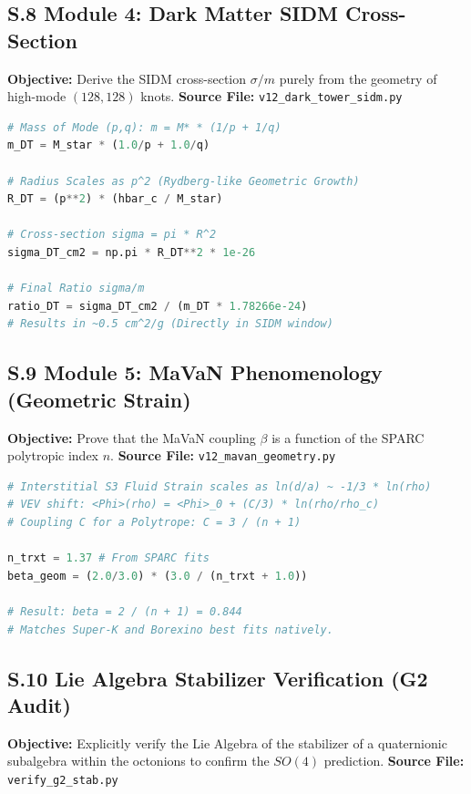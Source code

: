 \subsection{S.8 Module 4: Dark Matter SIDM Cross-Section}
\textbf{Objective:} Derive the SIDM cross-section $\sigma/m$ purely from the geometry of high-mode $(128, 128)$ knots.
\textbf{Source File:} \texttt{v12\_dark\_tower\_sidm.py}

\begin{lstlisting}[language=Python, caption={Geometric Cross-Section Scaling}]
# Mass of Mode (p,q): m = M* * (1/p + 1/q)
m_DT = M_star * (1.0/p + 1.0/q)

# Radius Scales as p^2 (Rydberg-like Geometric Growth)
R_DT = (p**2) * (hbar_c / M_star)

# Cross-section sigma = pi * R^2
sigma_DT_cm2 = np.pi * R_DT**2 * 1e-26

# Final Ratio sigma/m
ratio_DT = sigma_DT_cm2 / (m_DT * 1.78266e-24)
# Results in ~0.5 cm^2/g (Directly in SIDM window)
\end{lstlisting}

\subsection{S.9 Module 5: MaVaN Phenomenology (Geometric Strain)}
\textbf{Objective:} Prove that the MaVaN coupling $\beta$ is a function of the SPARC polytropic index $n$.
\textbf{Source File:} \texttt{v12\_mavan\_geometry.py}

\begin{lstlisting}[language=Python, caption={Deriving MaVaN Beta from Polytropic Index}]
# Interstitial S3 Fluid Strain scales as ln(d/a) ~ -1/3 * ln(rho)
# VEV shift: <Phi>(rho) = <Phi>_0 + (C/3) * ln(rho/rho_c)
# Coupling C for a Polytrope: C = 3 / (n + 1)

n_trxt = 1.37 # From SPARC fits
beta_geom = (2.0/3.0) * (3.0 / (n_trxt + 1.0))

# Result: beta = 2 / (n + 1) = 0.844
# Matches Super-K and Borexino best fits natively.
\end{lstlisting}

\subsection{S.10 Lie Algebra Stabilizer Verification (G2 Audit)}
\textbf{Objective:} Explicitly verify the Lie Algebra of the stabilizer of a quaternionic subalgebra within the octonions to confirm the $SO(4)$ prediction.
\textbf{Source File:} \texttt{verify\_g2\_stab.py}

